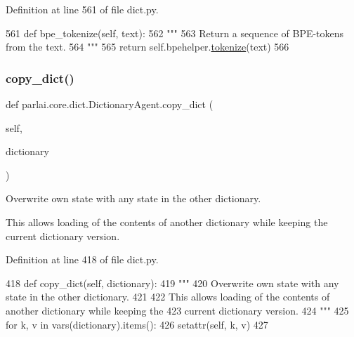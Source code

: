 Definition at line 561 of file dict.\+py.


\begin{DoxyCode}
561     \textcolor{keyword}{def }bpe\_tokenize(self, text):
562         \textcolor{stringliteral}{"""}
563 \textcolor{stringliteral}{        Return a sequence of BPE-tokens from the text.}
564 \textcolor{stringliteral}{        """}
565         \textcolor{keywordflow}{return} self.bpehelper.\hyperlink{namespaceparlai_1_1agents_1_1tfidf__retriever_1_1build__tfidf_a1fdb457e98eb4e4c26047e229686a616}{tokenize}(text)
566 
\end{DoxyCode}
\mbox{\label{classparlai_1_1core_1_1dict_1_1DictionaryAgent_a84faa359351d8b3edfb333e3b5f5ed71}} 
\subsubsection{\texorpdfstring{copy\+\_\+dict()}{copy\_dict()}}
{\footnotesize\ttfamily def parlai.\+core.\+dict.\+Dictionary\+Agent.\+copy\+\_\+dict (\begin{DoxyParamCaption}\item[{}]{self,  }\item[{}]{dictionary }\end{DoxyParamCaption})}

\begin{DoxyVerb}Overwrite own state with any state in the other dictionary.

This allows loading of the contents of another dictionary while keeping the
current dictionary version.
\end{DoxyVerb}
 

Definition at line 418 of file dict.\+py.


\begin{DoxyCode}
418     \textcolor{keyword}{def }copy\_dict(self, dictionary):
419         \textcolor{stringliteral}{"""}
420 \textcolor{stringliteral}{        Overwrite own state with any state in the other dictionary.}
421 \textcolor{stringliteral}{}
422 \textcolor{stringliteral}{        This allows loading of the contents of another dictionary while keeping the}
423 \textcolor{stringliteral}{        current dictionary version.}
424 \textcolor{stringliteral}{        """}
425         \textcolor{keywordflow}{for} k, v \textcolor{keywordflow}{in} vars(dictionary).items():
426             setattr(self, k, v)
427 
\end{DoxyCode}
\mbox{\label{classparlai_1_1core_1_1dict_1_1DictionaryAgent_a72cfec62b2d5117326f514edfe848a1e}} 
